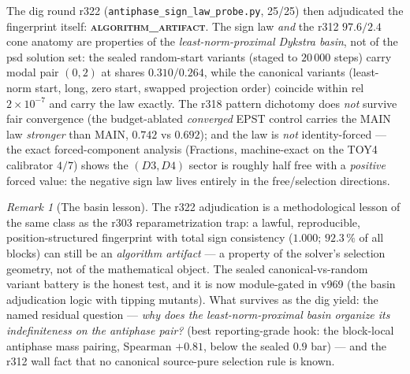 \documentclass[11pt]{article}
\theoremstyle{definition}
\theoremstyle{remark}
\newtheorem{remark}[theorem]{Remark}
\begin{document}
The dig round r322 (\texttt{antiphase\_sign\_law\_probe.py}, 25/25)
then adjudicated the fingerprint itself:
\textbf{\textsc{algorithm\_artifact}}.  The sign law \emph{and} the
r312 $97.6/2.4$ cone anatomy are properties of the
\emph{least-norm-proximal Dykstra basin}, not of the psd solution
set: the sealed random-start variants (staged to $20\,000$ steps)
carry modal pair $(0, 2)$ at shares $0.310/0.264$, while the
canonical variants (least-norm start, long, zero start, swapped
projection order) coincide within rel $2\times10^{-7}$ and carry
the law exactly.  The r318 pattern dichotomy does \emph{not}
survive fair convergence (the budget-ablated \emph{converged} EPST
control carries the MAIN law \emph{stronger} than MAIN, $0.742$ vs
$0.692$); and the law is \emph{not} identity-forced --- the exact
forced-component analysis (Fractions, machine-exact on the TOY4
calibrator $4/7$) shows the $(D3, D4)$ sector is roughly half free
with a \emph{positive} forced value: the negative sign law lives
entirely in the free/selection directions.

\begin{remark}[The basin lesson]\label{rem:basinlesson}
The r322 adjudication is a methodological lesson of the same class
as the r303 reparametrization trap: a lawful, reproducible,
position-structured fingerprint with total sign consistency
($1.000$; $92.3\,\%$ of all blocks) can still be an
\emph{algorithm artifact} --- a property of the solver's selection
geometry, not of the mathematical object.  The sealed
canonical-vs-random variant battery is the honest test, and it is
now module-gated in v969 (the basin adjudication logic with tipping
mutants).  What survives as the dig yield: the named residual
question --- \emph{why does the least-norm-proximal basin organize
its indefiniteness on the antiphase pair?} (best reporting-grade
hook: the block-local antiphase mass pairing, Spearman $+0.81$,
below the sealed $0.9$ bar) --- and the r312 wall fact that no
canonical source-pure selection rule is known.
\end{remark}
\end{document}
